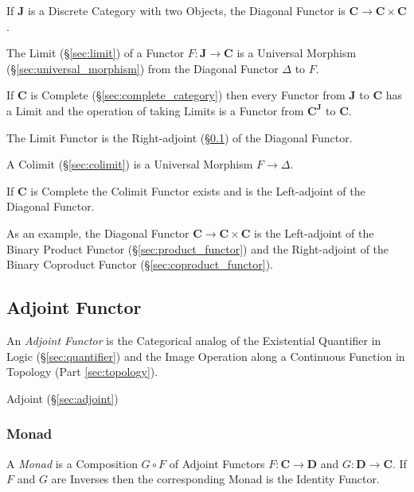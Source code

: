 If $\mathbf{J}$ is a Discrete Category with two Objects, the Diagonal
Functor is $\mathbf{C} \rightarrow \mathbf{C} \times \mathbf{C}$.

The Limit (\S\ref{sec:limit}) of a Functor $F : \mathbf{J} \rightarrow
\mathbf{C}$ is a Universal Morphism (\S\ref{sec:universal_morphism})
from the Diagonal Functor $\Delta$ to $F$.

If $\mathbf{C}$ is Complete (\S\ref{sec:complete_category}) then every
Functor from $\mathbf{J}$ to $\mathbf{C}$ has a Limit and the
operation of taking Limits is a Functor from $\mathbf{C}^\mathbf{J}$
to $\mathbf{C}$.

The Limit Functor is the Right-adjoint (\S\ref{sec:adjoint_functor})
of the Diagonal Functor.

A Colimit (\S\ref{sec:colimit}) is a Universal Morphism $F \rightarrow
\Delta$.

If $\mathbf{C}$ is Complete the Colimit Functor exists and is the
Left-adjoint of the Diagonal Functor.

As an example, the Diagonal Functor $\mathbf{C} \rightarrow \mathbf{C}
\times \mathbf{C}$ is the Left-adjoint of the Binary Product Functor
(\S\ref{sec:product_functor}) and the Right-adjoint of the Binary
Coproduct Functor (\S\ref{sec:coproduct_functor}).



\subsection{Adjoint Functor}\label{sec:adjoint_functor}

An \emph{Adjoint Functor} is the Categorical analog of the Existential
Quantifier in Logic (\S\ref{sec:quantifier}) and the Image Operation
along a Continuous Function in Topology (Part \ref{sec:topology}).

Adjoint (\S\ref{sec:adjoint})



\subsubsection{Monad}\label{sec:monad}

A \emph{Monad} is a Composition $G \circ F$ of Adjoint Functors $F :
\mathbf{C} \rightarrow \mathbf{D}$ and $G : \mathbf{D} \rightarrow
\mathbf{C}$. If $F$ and $G$ are Inverses then the corresponding Monad
is the Identity Functor.

